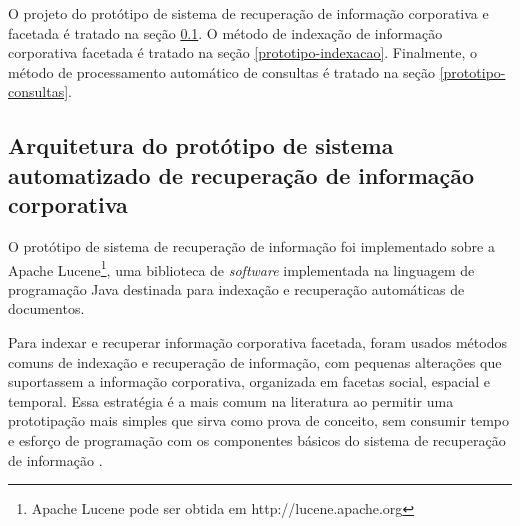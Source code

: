 
O projeto do protótipo de sistema de recuperação de informação corporativa e facetada é tratado na seção \ref{prototipo-arquitetura}. O método de indexação de informação corporativa facetada é tratado na seção \ref{prototipo-indexacao}. Finalmente, o método de processamento automático de consultas é tratado na seção \ref{prototipo-consultas}.




\subsection{Arquitetura do protótipo de sistema automatizado de recuperação de informação corporativa}
\label{prototipo-arquitetura}

O protótipo de sistema de recuperação de informação foi implementado sobre a Apache Lucene\footnote{Apache Lucene pode ser obtida em http://lucene.apache.org}, uma biblioteca de \textit{software} implementada na linguagem de programação Java destinada para indexação e recuperação automáticas de documentos.

Para indexar e recuperar informação corporativa facetada, foram usados métodos comuns de indexação e recuperação de informação, com pequenas alterações que suportassem a informação corporativa, organizada em facetas social, espacial e temporal. Essa estratégia é a mais comum na literatura ao permitir uma prototipação mais simples que sirva como prova de conceito, sem consumir tempo e esforço de programação com os componentes básicos do sistema de recuperação de informação \cite{anastacio09}.

